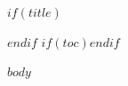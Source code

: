 \documentclass[11pt,a4paper]{article}
\begin{document}
$if(title)$\maketitle$endif$
$if(toc)$\tableofcontents\newpage$endif$

$body$
\end{document}
